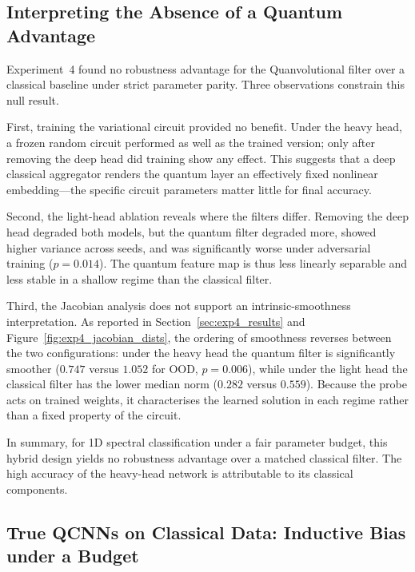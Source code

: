 \subsection{Interpreting the Absence of a Quantum Advantage}
\label{sec:discussion_exp4}

Experiment~4 found no robustness advantage for the Quanvolutional filter over a classical baseline under strict parameter parity. Three observations constrain this null result.

First, training the variational circuit provided no benefit. Under the heavy head, a frozen random circuit performed as well as the trained version; only after removing the deep head did training show any effect. This suggests that a deep classical aggregator renders the quantum layer an effectively fixed nonlinear embedding—the specific circuit parameters matter little for final accuracy.

Second, the light-head ablation reveals where the filters differ. Removing the deep head degraded both models, but the quantum filter degraded more, showed higher variance across seeds, and was significantly worse under adversarial training ($p=0.014$). The quantum feature map is thus less linearly separable and less stable in a shallow regime than the classical filter.

Third, the Jacobian analysis does not support an intrinsic-smoothness interpretation. As reported in Section~\ref{sec:exp4_results} and Figure~\ref{fig:exp4_jacobian_dists}, the ordering of smoothness reverses between the two configurations: under the heavy head the quantum filter is significantly smoother ($0.747$ versus $1.052$ for OOD, $p=0.006$), while under the light head the classical filter has the lower median norm ($0.282$ versus $0.559$). Because the probe acts on trained weights, it characterises the learned solution in each regime rather than a fixed property of the circuit.

In summary, for 1D spectral classification under a fair parameter budget, this hybrid design yields no robustness advantage over a matched classical filter. The high accuracy of the heavy-head network is attributable to its classical components.

\subsection{True QCNNs on Classical Data: Inductive Bias under a Budget}
\label{sec:discussion_exp5}

